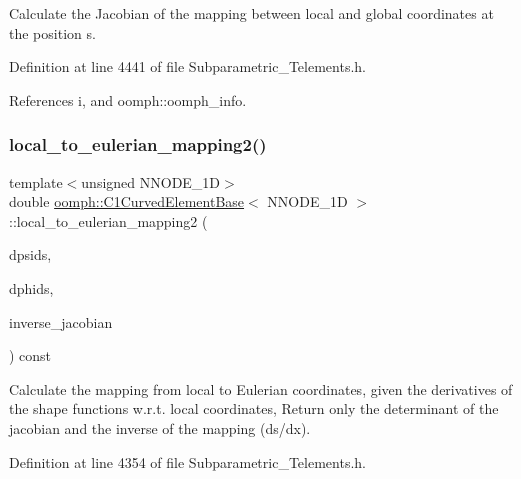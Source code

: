 Calculate the Jacobian of the mapping between local and global coordinates at the position s. 



Definition at line 4441 of file Subparametric\+\_\+\+Telements.\+h.



References i, and oomph\+::oomph\+\_\+info.

\mbox{\label{classoomph_1_1C1CurvedElementBase_a8152ea7e16851b419f1036911f35dbee}} 
\subsubsection{\texorpdfstring{local\+\_\+to\+\_\+eulerian\+\_\+mapping2()}{local\_to\_eulerian\_mapping2()}\hspace{0.1cm}{\footnotesize\ttfamily [1/2]}}
{\footnotesize\ttfamily template$<$unsigned N\+N\+O\+D\+E\+\_\+1D$>$ \\
double \hyperlink{classoomph_1_1C1CurvedElementBase}{oomph\+::\+C1\+Curved\+Element\+Base}$<$ N\+N\+O\+D\+E\+\_\+1D $>$\+::local\+\_\+to\+\_\+eulerian\+\_\+mapping2 (\begin{DoxyParamCaption}\item[{const \hyperlink{classoomph_1_1DShape}{D\+Shape} \&}]{dpsids,  }\item[{\hyperlink{classoomph_1_1DShape}{D\+Shape} \&}]{dphids,  }\item[{\hyperlink{classoomph_1_1DenseMatrix}{Dense\+Matrix}$<$ double $>$ \&}]{inverse\+\_\+jacobian }\end{DoxyParamCaption}) const\hspace{0.3cm}{\ttfamily [inline]}}



Calculate the mapping from local to Eulerian coordinates, given the derivatives of the shape functions w.\+r.\+t. local coordinates, Return only the determinant of the jacobian and the inverse of the mapping (ds/dx). 



Definition at line 4354 of file Subparametric\+\_\+\+Telements.\+h.

